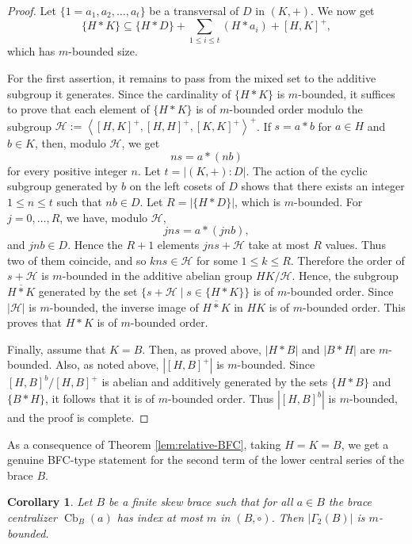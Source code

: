\documentclass[10pt,a4paper]{amsart}
\numberwithin{equation}{section}
\newtheorem{cor}[equation]{Corollary}
\newcommand{\Cb}{\operatorname{Cb} }
\newcommand{\gen}[1]{\left < #1 \right >}
\begin{document}
\begin{proof}
Let $\{1=a_1,a_2,\dots,a_t\}$ be a transversal of $D$ in $(K,+)$. We now get 
$$\{H*K\} \subseteq \{H*D\}+ \sum_{1\leqslant i\leqslant t}(H*a_i) + [H, K]^+,$$ 
which has $m$-bounded size. 


For the first assertion, it remains to pass from the mixed set to the additive subgroup it generates.
Since the cardinality of $\{H * K\}$ is $m$-bounded, it suffices to prove that each element of $\{H * K\}$ is of $m$-bounded order modulo the subgroup $\mathcal{H}:=\gen{[H,K]^+, [H, H]^+, [K, K]^+}^+$. If $s =a * b$ for $a \in H$ and $b \in K$, then, modulo  $\mathcal{H}$, we get
\[
 n  s = a*(n  b)
\]
for every positive integer $n$. Let $t=|(K,+):D|$. The action of the cyclic subgroup generated by $b$ on the left cosets of $D$ shows that there exists an integer $1\leqslant n\leqslant t$ such that $nb\in D$. Let $R=|\{H*D\}|$, which is $m$-bounded. For $j=0,\ldots,R$, we have, modulo $\mathcal H$,
$$
jns=a*(jnb),
$$
and $jnb\in D$. Hence the $R+1$ elements $jns+\mathcal H$ take at most $R$ values. Thus two of them coincide, and so $kns\in\mathcal H$ for some $1\leqslant k\leqslant R$. Therefore the order of $s+\mathcal H$ is $m$-bounded in the additive abelian group $HK/\mathcal H$. Hence, the subgroup $\overline{H * K}$ generated by the set $\{s + \mathcal{H} \mid s \in \{H * K\}\}$ is of $m$-bounded order. Since $|\mathcal{H}|$ is $m$-bounded, the inverse image of $\overline{H * K}$ in $HK$ is of $m$-bounded order. This proves that $H*K$ is of $m$-bounded order. 

Finally, assume that $K=B$. Then, as proved above, $|H*B|$ and $|B*H|$ are $m$-bounded. Also, as noted above,  $|[H, B]^+|$ is $m$-bounded.  Since $[H,B]^b/[H,B]^+$ is abelian and additively generated by  the sets $\{H * B\}$ and $\{B*H\}$, it follows that it is of $m$-bounded order. Thus  $|[H,B]^b|$ is  $m$-bounded, and the proof is complete.
\end{proof}

As a consequence of Theorem \ref{lem:relative-BFC}, taking $H = K = B$, we get a genuine BFC-type statement for the second term of the lower central series of the brace $B$.

\begin{cor}\label{cor:bfc-gamma}
Let $B$ be a finite skew brace such that  for all $a \in B$ the brace centralizer $\Cb_B(a)$ has index at most $m$ in $(B,\circ)$. Then $|\Gamma_2(B)|$ is $m$-bounded.
\end{cor}
\end{document}
